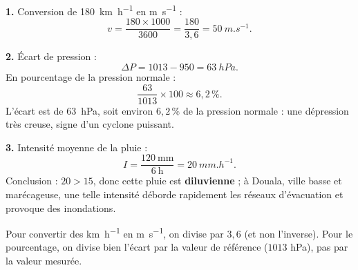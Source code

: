 \documentclass[11pt]{article}
\begin{document}
\begin{corrige}
\textbf{1.} Conversion de \SI{180}{km.h^{-1}} en \si{m.s^{-1}} :
\[ v = \frac{180 \times 1000}{3600} = \frac{180}{3,6} = \SI{50}{m.s^{-1}}. \]

\textbf{2.} Écart de pression :
\[ \Delta P = 1013 - 950 = \SI{63}{hPa}. \]
En pourcentage de la pression normale :
\[ \frac{63}{1013} \times 100 \approx 6,2\,\%. \]
L'écart est de \SI{63}{hPa}, soit environ $6,2\,\%$ de la pression normale : une dépression très creuse, signe d'un cyclone puissant.

\textbf{3.} Intensité moyenne de la pluie :
\[ I = \frac{120\ \text{mm}}{6\ \text{h}} = \SI{20}{mm.h^{-1}}. \]
Conclusion : $20 > 15$, donc cette pluie est \textbf{diluvienne} ; à Douala, ville basse et marécageuse, une telle intensité déborde rapidement les réseaux d'évacuation et provoque des inondations.
\end{corrige}

\begin{attention}
Pour convertir des \si{km.h^{-1}} en \si{m.s^{-1}}, on divise par $3,6$ (et non l'inverse). Pour le pourcentage, on divise bien l'écart par la valeur de référence ($1013$ hPa), pas par la valeur mesurée.
\end{attention}
\end{document}
